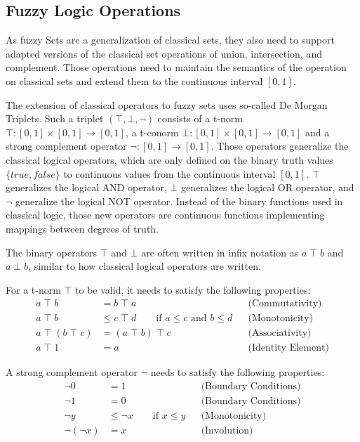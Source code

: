 \subsection{Fuzzy Logic Operations}

As fuzzy Sets are a generalization of classical sets, they also need to support adapted versions of the classical set operations of union, intersection, and complement. Those operations need to maintain the semantics of the operation on classical sets and extend them to the continuous interval $[0, 1]$.

The extension of classical operators to fuzzy sets uses so-called De Morgan Triplets. Such a triplet $(\top, \bot, \neg)$ consists of a t-norm $\top : [0, 1] \times [0, 1] \rightarrow [0, 1]$, a t-conorm $\bot : [0, 1] \times [0, 1] \rightarrow [0, 1]$ and a strong complement operator $\neg : [0, 1] \rightarrow [0, 1]$. Those operators generalize the classical logical operators, which are only defined on the binary truth values $\{true, false\}$ to continuous values from the continuous interval $[0, 1]$. $\top$ generalizes the logical AND operator, $\bot$ generalizes the logical OR operator, and $\neg$ generalize the logical NOT operator. Instead of the binary functions used in classical logic, those new operators are continuous functions implementing mappings between degrees of truth.

The binary operators $\top$ and $\bot$ are often written in infix notation as $a \; \top \; b$ and $a \; \bot \; b$, similar to how classical logical operators are written.
\smallskip

For a t-norm $\top$ to be valid, it needs to satisfy the following properties:
\begin{align*}
      a \;  \top \;  b              & = b \; \top \; a                                                     &  & \text{(Commutativity)}    \\
      a \; \top \;  b               & \leq c \; \top\;  d \qquad \text{if } a \leq c \text{ and } b \leq d &  & \text{(Monotonicity)}     \\
      a \; \top \; (b \; \top\;  c) & = (a \; \top\;  b) \; \top\;  c                                      &  & \text{(Associativity)}    \\
      a \; \top\;  1                & = a                                                                  &  & \text{(Identity Element)}
\end{align*}

A strong complement operator $\neg$ needs to satisfy the following properties:
\begin{align*}
      \neg 0        & = 1                                    &  & \text{(Boundary Conditions)} \\
      \neg 1        & = 0                                    &  & \text{(Boundary Conditions)} \\
      \neg y        & \leq \neg x \qquad \text{if } x \leq y &  & \text{(Monotonicity)}        \\
      \neg (\neg x) & = x                                    &  & \text{(Involution)}
\end{align*}

